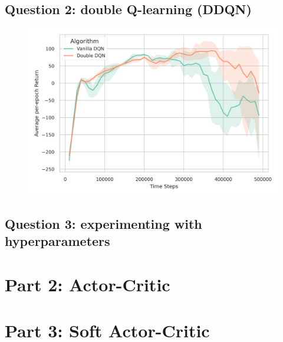 \documentclass[10pt, letterpaper]{article}
\begin{document}
\subsection*{Question 2: double Q-learning (DDQN)}
\begin{figure}[thbp]
    \centering 
    \includegraphics[width=\textwidth]{./img/q2.png}
    \caption{}
    \label{fig: 2}
\end{figure}

\subsection*{Question 3: experimenting with hyperparameters}

\newpage
\section{Part 2: Actor-Critic}

\newpage
\section{Part 3: Soft Actor-Critic}
\end{document}
